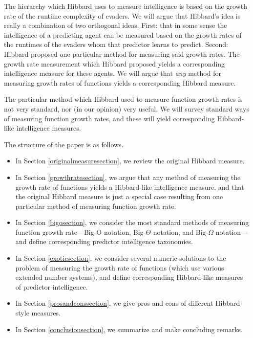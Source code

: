 \documentclass{article}
\begin{document}
The hierarchy which Hibbard uses to measure intelligence is based on the growth
rate of the runtime complexity of evaders.
We will argue that Hibbard's idea is really a combination of two
orthogonal ideas. First: that in some sense the intelligence of a predicting agent
can be measured based on the growth rates of the runtimes of the evaders whom that
predictor learns to predict. Second: Hibbard proposed one particular method for
measuring said growth rates. The growth rate measurement which Hibbard proposed yields
a corresponding intelligence measure for these agents. We will argue that \emph{any}
method for measuring growth rates of functions yields a corresponding Hibbard measure.

The particular method which Hibbard used to measure function growth rates is
not very standard, nor (in our opinion) very useful. We will survey standard
ways of measuring function growth rates, and these will yield corresponding
Hibbard-like intelligence measures.

The structure of the paper is as follows.
\begin{itemize}
    \item
    In Section \ref{originalmeasuresection}, we review the original Hibbard measure.
    \item
    In Section \ref{growthratesection}, we argue that any method of measuring
    the growth rate of functions yields a Hibbard-like intelligence measure,
    and that the original Hibbard measure is just a special case resulting from
    one particular method of measuring function growth rate.
    \item
    In Section \ref{bigosection}, we consider the most standard methods of measuring
    function growth rate---Big-O notation, Big-$\Theta$ notation, and Big-$\Omega$
    notation---and define corresponding predictor intelligence taxonomies.
    \item
    In Section \ref{exoticsection}, we consider several numeric solutions to
    the problem of measuring the growth rate of functions (which use various extended number
    systems), and define
    corresponding Hibbard-like measures of predictor intelligence.
    \item
    In Section \ref{prosandconssection}, we give pros and cons of different
    Hibbard-style measures.
    \item
    In Section \ref{conclusionsection}, we summarize and make concluding remarks.
\end{itemize}
\end{document}
